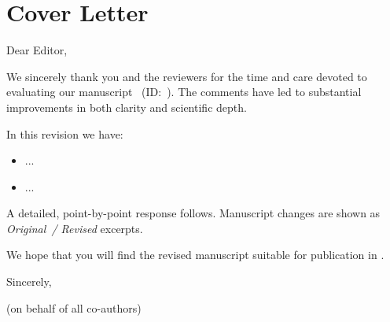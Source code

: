 \section*{Cover Letter}

Dear Editor,

We sincerely thank you and the reviewers for the time and care devoted to
evaluating our manuscript~\textit{\ManuscriptTitle} (ID:~\ManuscriptID).
The comments have led to substantial improvements in both clarity and
scientific depth.

In this revision we have:
\begin{itemize}
  \item ...
  \item ...
\end{itemize}

A detailed, point-by-point response follows. Manuscript changes are shown
as \emph{Original~/ Revised} excerpts.

We hope that you will find the revised manuscript suitable for publication
in \textit{\JournalName}.

Sincerely,

\CorrespondingAuthor{} (on behalf of all co-authors)
\newpage
